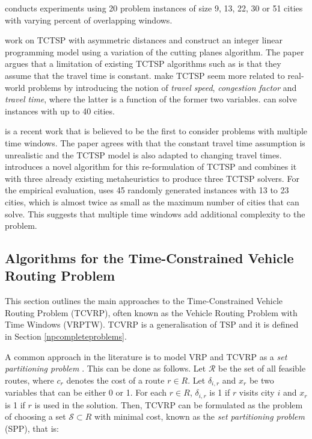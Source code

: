 \documentclass{mprop}
\theoremstyle{definition}
\begin{document}
\citet{Baker83} conducts experiments using 20 problem instances of size 9, 13, 22, 30 or 51 cities with varying percent of overlapping windows.

\citet{ariglianotime} work on TCTSP with asymmetric distances 
and construct an integer linear programming model using a variation of the cutting planes algorithm. The paper argues that a limitation of existing TCTSP algorithms such as \citep{Baker83} is that they assume that the travel time is constant. \citet{ariglianotime} make TCTSP seem more related to real-world problems by introducing the notion of \textit{travel speed}, \textit{congestion factor} and \textit{travel time}, where the latter is a function of the former two variables. \citet{ariglianotime} can solve instances with up to 40 cities.

\citet{Hurkala15} is a recent work that is believed to be the first to consider problems with multiple time windows. The paper agrees with \citet{ariglianotime} that the constant travel time assumption is unrealistic and the TCTSP model is also adapted to changing travel times. \citet{Hurkala15} introduces a novel algorithm for this re-formulation of TCTSP and combines it with three already existing metaheuristics to produce three TCTSP solvers. For the empirical evaluation, \citet{Hurkala15} uses 45 randomly generated instances with 13 to 23 cities, which is almost twice as small as the maximum number of cities that \citet{ariglianotime} can solve. This suggests that multiple time windows add additional complexity to the problem.

\subsection{Algorithms for the Time-Constrained Vehicle Routing Problem}
\label{sec:tcvrpalgos}
This section outlines the main approaches to the Time-Constrained Vehicle Routing Problem (TCVRP), often known as the Vehicle Routing Problem with Time Windows (VRPTW). TCVRP is a generalisation of TSP and it is defined in Section \ref{npcompleteproblems}.

A common approach in the literature is to model VRP and TCVRP as a \textit{set partitioning problem} \citep{Desrochers92,Agarwal89,Desrosiers84,Alvarenga07}. This can be done as follows. Let $\mathcal{R}$ be the set of all feasible routes, where $c_{r}$ denotes the cost of a route $r \in R$. Let $\delta_{i,r}$ and $x_{r}$ be two variables that can be either 0 or 1. For each $r \in R$, $\delta_{i,r}$ is 1 if $r$ visits city $i$ and $x_{r}$ is 1 if $r$ is used in the solution. Then, TCVRP can be formulated as the problem of choosing a set $\mathcal{S} \subset R$ with minimal cost, known as the \textit{set partitioning problem} (SPP), that is:
\end{document}
